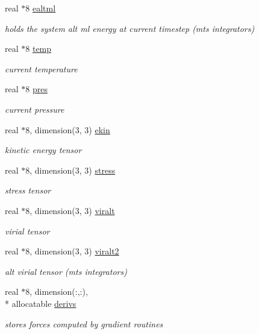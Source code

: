 \begin{DoxyCompactItemize}
real $\ast$8 \hyperlink{classmdstuf1_a1a70064e6eae90b20859e8432d8ae9d5}{ealtml}
\begin{DoxyCompactList}\small\item\em holds the system alt ml energy at current timestep (mts integrators) \end{DoxyCompactList}\item 
real $\ast$8 \hyperlink{classmdstuf1_a8dffc1a48b43cecdf7898a9d2915f64a}{temp}
\begin{DoxyCompactList}\small\item\em current temperature \end{DoxyCompactList}\item 
real $\ast$8 \hyperlink{classmdstuf1_aa2b1ca9b0984aa24f64d346dc05b66f9}{pres}
\begin{DoxyCompactList}\small\item\em current pressure \end{DoxyCompactList}\item 
real $\ast$8, dimension(3, 3) \hyperlink{classmdstuf1_aab46c7b16224602ecf8bf98020200d90}{ekin}
\begin{DoxyCompactList}\small\item\em kinetic energy tensor \end{DoxyCompactList}\item 
real $\ast$8, dimension(3, 3) \hyperlink{classmdstuf1_a818a42a7bf46938e3866626a2d31124a}{stress}
\begin{DoxyCompactList}\small\item\em stress tensor \end{DoxyCompactList}\item 
real $\ast$8, dimension(3, 3) \hyperlink{classmdstuf1_a9e1d656294d5f17e46669001257293e5}{viralt}
\begin{DoxyCompactList}\small\item\em virial tensor \end{DoxyCompactList}\item 
real $\ast$8, dimension(3, 3) \hyperlink{classmdstuf1_a56e3e4e4eee11aee825348758863131e}{viralt2}
\begin{DoxyCompactList}\small\item\em alt virial tensor (mts integrators) \end{DoxyCompactList}\item 
real $\ast$8, dimension(\-:,\-:), \\*
allocatable \hyperlink{classmdstuf1_a51707f5cb35150bb27d8d2e190a78dd8}{derivs}
\begin{DoxyCompactList}\small\item\em stores forces computed by gradient routines \end{DoxyCompactList}\end{DoxyCompactItemize}


